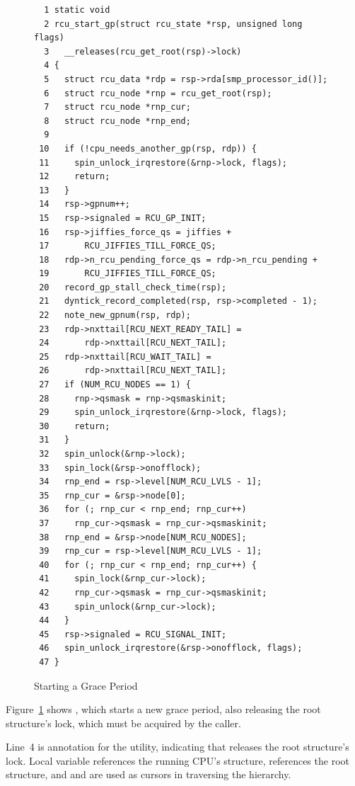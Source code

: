 \begin{figure}[tbp]
{ \scriptsize
\begin{verbatim}
  1 static void
  2 rcu_start_gp(struct rcu_state *rsp, unsigned long flags)
  3   __releases(rcu_get_root(rsp)->lock)
  4 {
  5   struct rcu_data *rdp = rsp->rda[smp_processor_id()];
  6   struct rcu_node *rnp = rcu_get_root(rsp);
  7   struct rcu_node *rnp_cur;
  8   struct rcu_node *rnp_end;
  9
 10   if (!cpu_needs_another_gp(rsp, rdp)) {
 11     spin_unlock_irqrestore(&rnp->lock, flags);
 12     return;
 13   }
 14   rsp->gpnum++;
 15   rsp->signaled = RCU_GP_INIT;
 16   rsp->jiffies_force_qs = jiffies +
 17       RCU_JIFFIES_TILL_FORCE_QS;
 18   rdp->n_rcu_pending_force_qs = rdp->n_rcu_pending +
 19       RCU_JIFFIES_TILL_FORCE_QS;
 20   record_gp_stall_check_time(rsp);
 21   dyntick_record_completed(rsp, rsp->completed - 1);
 22   note_new_gpnum(rsp, rdp);
 23   rdp->nxttail[RCU_NEXT_READY_TAIL] =
 24       rdp->nxttail[RCU_NEXT_TAIL];
 25   rdp->nxttail[RCU_WAIT_TAIL] =
 26       rdp->nxttail[RCU_NEXT_TAIL];
 27   if (NUM_RCU_NODES == 1) {
 28     rnp->qsmask = rnp->qsmaskinit;
 29     spin_unlock_irqrestore(&rnp->lock, flags);
 30     return;
 31   }
 32   spin_unlock(&rnp->lock);
 33   spin_lock(&rsp->onofflock);
 34   rnp_end = rsp->level[NUM_RCU_LVLS - 1];
 35   rnp_cur = &rsp->node[0];
 36   for (; rnp_cur < rnp_end; rnp_cur++)
 37     rnp_cur->qsmask = rnp_cur->qsmaskinit;
 38   rnp_end = &rsp->node[NUM_RCU_NODES];
 39   rnp_cur = rsp->level[NUM_RCU_LVLS - 1];
 40   for (; rnp_cur < rnp_end; rnp_cur++) {
 41     spin_lock(&rnp_cur->lock);
 42     rnp_cur->qsmask = rnp_cur->qsmaskinit;
 43     spin_unlock(&rnp_cur->lock);
 44   }
 45   rsp->signaled = RCU_SIGNAL_INIT;
 46   spin_unlock_irqrestore(&rsp->onofflock, flags);
 47 }
\end{verbatim}
}
\caption{Starting a Grace Period}
\label{fig:app:rcuimpl:rcutreewt:Starting a Grace Period}
\end{figure}

Figure~\ref{fig:app:rcuimpl:rcutreewt:Starting a Grace Period}
shows , which starts a new grace period,
also releasing the root  structure's lock, which
must be acquired by the caller.

Line~4 is annotation for the  utility, indicating
that  releases the root 
structure's lock.
Local variable  references the running CPU's 
structure,  references the root  structure,
and  and  are used as cursors in traversing
the  hierarchy.

